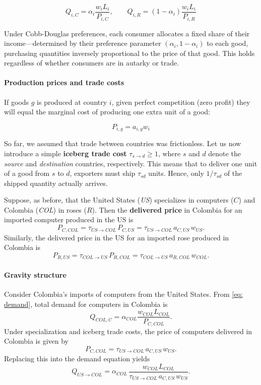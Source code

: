 \documentclass[11pt,letterpaper]{article}
\begin{document}
\begin{equation}\label{eq: demand}
    Q_{i,C} = \alpha_i  \frac{w_i L_i}{P_{i,C}}, \qquad Q_{i,R} = (1-\alpha_i) \frac{w_i L_i}{P_{i,R}}
\end{equation}
\normalsize

Under Cobb-Douglas preferences, each consumer allocates a fixed share of their income—determined by their preference parameter $(\alpha_i, 1-\alpha_i)$ to each good, purchasing quantities inversely proportional to the price of that good. This holds regardless of whether consumers are in autarky or trade. 

\paragraph{Production prices and trade costs} If goods $g$ is produced at country $i$, given perfect competition (zero profit) they will equal the marginal cost of producing one extra unit of a good: 

\begin{equation}\label{eq: autarky-prices}
            P_{i,g} = a_{i,g} w_i
\end{equation}

So far, we assumed that trade between countries was frictionless. Let us now introduce a simple \textbf{iceberg trade cost} $\tau_{s \to d}\ge1$, where $s$ and $d$ denote the \emph{source} and \emph{destination} countries, respectively. This means that to deliver one unit of a good from $s$ to $d$, exporters must ship $\tau_{sd}$ units. Hence, only $1/\tau_{sd}$ of the shipped quantity actually arrives.

\medskip
\noindent
Suppose, as before, that the United States (\textit{US}) specializes in computers ($C$) and
Colombia (\textit{COL}) in roses ($R$).  
Then the \textbf{delivered price} in Colombia for an imported computer produced in the US is
\[ P_{C,COL} = \tau_{US\to COL}\, P_{C,US} = \tau_{US\to COL}\, a_{C,US}\, w_{US}. \]
Similarly, the delivered price in the US for an imported rose produced in Colombia is
\[ P_{R,US} = \tau_{COL\to US}\, P_{R,COL} = \tau_{COL\to US}\, a_{R,COL}\, w_{COL}. \]


\paragraph{Gravity structure} 
Consider Colombia’s imports of computers from the United States.  From \eqref{eq: demand}, total demand for computers in Colombia is
\[
Q_{COL,C} = \alpha_{COL} \frac{w_{COL} L_{COL}}{P_{C,COL}}.
\]
Under specialization and iceberg trade costs, the price of computers delivered in Colombia is given by
\[
P_{C,COL} = \tau_{US\to COL}\, a_{C,US}\, w_{US}.
\]
Replacing this into the demand equation yields
\begin{equation}\label{eq: gravity-quantities}
    Q_{US \to COL} 
    = \alpha_{COL}\, 
      \frac{w_{COL} L_{COL}}
           {\tau_{US\to COL}\, a_{C,US}\, w_{US}}.
\end{equation}
\end{document}
